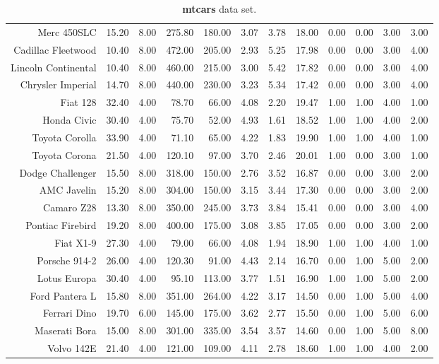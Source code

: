 \documentclass{article}\usepackage[]{graphicx}\usepackage[]{color}
\begin{document}
\begin{table}[ht]
\begin{tabular}{rrrrrrrrrrrr}
  Merc 450SLC & 15.20 & 8.00 & 275.80 & 180.00 & 3.07 & 3.78 & 18.00 & 0.00 & 0.00 & 3.00 & 3.00 \\ 
  Cadillac Fleetwood & 10.40 & 8.00 & 472.00 & 205.00 & 2.93 & 5.25 & 17.98 & 0.00 & 0.00 & 3.00 & 4.00 \\ 
  Lincoln Continental & 10.40 & 8.00 & 460.00 & 215.00 & 3.00 & 5.42 & 17.82 & 0.00 & 0.00 & 3.00 & 4.00 \\ 
  Chrysler Imperial & 14.70 & 8.00 & 440.00 & 230.00 & 3.23 & 5.34 & 17.42 & 0.00 & 0.00 & 3.00 & 4.00 \\ 
  Fiat 128 & 32.40 & 4.00 & 78.70 & 66.00 & 4.08 & 2.20 & 19.47 & 1.00 & 1.00 & 4.00 & 1.00 \\ 
  Honda Civic & 30.40 & 4.00 & 75.70 & 52.00 & 4.93 & 1.61 & 18.52 & 1.00 & 1.00 & 4.00 & 2.00 \\ 
  Toyota Corolla & 33.90 & 4.00 & 71.10 & 65.00 & 4.22 & 1.83 & 19.90 & 1.00 & 1.00 & 4.00 & 1.00 \\ 
  Toyota Corona & 21.50 & 4.00 & 120.10 & 97.00 & 3.70 & 2.46 & 20.01 & 1.00 & 0.00 & 3.00 & 1.00 \\ 
  Dodge Challenger & 15.50 & 8.00 & 318.00 & 150.00 & 2.76 & 3.52 & 16.87 & 0.00 & 0.00 & 3.00 & 2.00 \\ 
  AMC Javelin & 15.20 & 8.00 & 304.00 & 150.00 & 3.15 & 3.44 & 17.30 & 0.00 & 0.00 & 3.00 & 2.00 \\ 
  Camaro Z28 & 13.30 & 8.00 & 350.00 & 245.00 & 3.73 & 3.84 & 15.41 & 0.00 & 0.00 & 3.00 & 4.00 \\ 
  Pontiac Firebird & 19.20 & 8.00 & 400.00 & 175.00 & 3.08 & 3.85 & 17.05 & 0.00 & 0.00 & 3.00 & 2.00 \\ 
  Fiat X1-9 & 27.30 & 4.00 & 79.00 & 66.00 & 4.08 & 1.94 & 18.90 & 1.00 & 1.00 & 4.00 & 1.00 \\ 
  Porsche 914-2 & 26.00 & 4.00 & 120.30 & 91.00 & 4.43 & 2.14 & 16.70 & 0.00 & 1.00 & 5.00 & 2.00 \\ 
  Lotus Europa & 30.40 & 4.00 & 95.10 & 113.00 & 3.77 & 1.51 & 16.90 & 1.00 & 1.00 & 5.00 & 2.00 \\ 
  Ford Pantera L & 15.80 & 8.00 & 351.00 & 264.00 & 4.22 & 3.17 & 14.50 & 0.00 & 1.00 & 5.00 & 4.00 \\ 
  Ferrari Dino & 19.70 & 6.00 & 145.00 & 175.00 & 3.62 & 2.77 & 15.50 & 0.00 & 1.00 & 5.00 & 6.00 \\ 
  Maserati Bora & 15.00 & 8.00 & 301.00 & 335.00 & 3.54 & 3.57 & 14.60 & 0.00 & 1.00 & 5.00 & 8.00 \\ 
  Volvo 142E & 21.40 & 4.00 & 121.00 & 109.00 & 4.11 & 2.78 & 18.60 & 1.00 & 1.00 & 4.00 & 2.00 \\ 
   \hline
\end{tabular}
\caption{\textbf{mtcars} data set.} 
\end{table}
\end{document}
